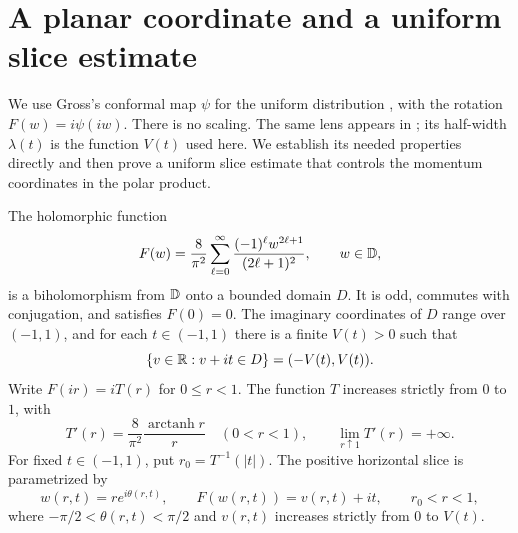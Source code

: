 \section{A planar coordinate and a uniform slice estimate}
\label{sec:planar}

We use Gross's conformal map $\psi$ for the uniform distribution
\cite[Section~3.2]{Gross2019}, with the rotation $F(w)=i\psi(iw)$.
There is no scaling. The same lens appears in
\cite[Section~3]{SymmetricCompanion2026}; its half-width $\lambda(t)$
is the function $V(t)$ used here. We establish its needed properties
directly and then prove a uniform slice estimate that controls the
momentum coordinates in the polar product.

\begin{lemma}\label{lem:planar-map}
The holomorphic function
\begin{equation}\label{eq:planar-F}
 F(w)=\frac{8}{\pi^2}\sum_{\ell=0}^{\infty}
       \frac{(-1)^\ell w^{2\ell+1}}{(2\ell+1)^2},
 \qquad w\in\mathbb D,
\end{equation}
is a biholomorphism from \(\mathbb D\) onto a bounded domain \(D\).
It is odd, commutes with conjugation, and satisfies \(F(0)=0\).
The imaginary coordinates of \(D\) range over \((-1,1)\), and for each
\(t\in(-1,1)\) there is a finite \(V(t)>0\) such that
\begin{equation}\label{eq:horizontal-slices}
 \{v\in\mathbb R:v+it\in D\}=(-V(t),V(t)).
\end{equation}
Write \(F(ir)=iT(r)\) for \(0\le r<1\).  The function \(T\) increases
strictly from \(0\) to \(1\), with
\begin{equation}\label{eq:planar-T}
 T'(r)=\frac{8}{\pi^2}\frac{\operatorname{arctanh}r}{r}
 \quad(0<r<1),
 \qquad \lim_{r\uparrow1}T'(r)=+\infty.
\end{equation}
For fixed \(t\in(-1,1)\), put \(r_0=T^{-1}(|t|)\).  The positive
horizontal slice is parametrized by
\[
 w(r,t)=re^{i\theta(r,t)},\qquad
 F(w(r,t))=v(r,t)+it,\qquad r_0<r<1,
\]
where \(-\pi/2<\theta(r,t)<\pi/2\) and \(v(r,t)\) increases strictly
from \(0\) to \(V(t)\).
\end{lemma}

